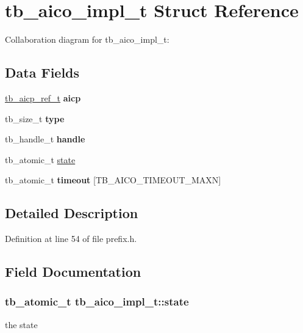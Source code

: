 \hypertarget{structtb__aico__impl__t}{\section{tb\-\_\-aico\-\_\-impl\-\_\-t Struct Reference}
\label{structtb__aico__impl__t}
}


Collaboration diagram for tb\-\_\-aico\-\_\-impl\-\_\-t\-:
\subsection*{Data Fields}
\begin{DoxyCompactItemize}
\item 
\hypertarget{structtb__aico__impl__t_a6de17735a82d4990b713bb2962cb177c}{\hyperlink{structtb__aicp__ref__t}{tb\-\_\-aicp\-\_\-ref\-\_\-t} {\bfseries aicp}}\label{structtb__aico__impl__t_a6de17735a82d4990b713bb2962cb177c}

\item 
\hypertarget{structtb__aico__impl__t_a4c6665defe1f6db4df3e20abfc0e8626}{tb\-\_\-size\-\_\-t {\bfseries type}}\label{structtb__aico__impl__t_a4c6665defe1f6db4df3e20abfc0e8626}

\item 
\hypertarget{structtb__aico__impl__t_a20fee3148d77278e186319ff64fad7b6}{tb\-\_\-handle\-\_\-t {\bfseries handle}}\label{structtb__aico__impl__t_a20fee3148d77278e186319ff64fad7b6}

\item 
tb\-\_\-atomic\-\_\-t \hyperlink{structtb__aico__impl__t_ab24d6c5dfa6466247b841acf5812c434}{state}
\item 
\hypertarget{structtb__aico__impl__t_a92d383a02f043ce375201d3610503dc3}{tb\-\_\-atomic\-\_\-t {\bfseries timeout} \mbox{[}T\-B\-\_\-\-A\-I\-C\-O\-\_\-\-T\-I\-M\-E\-O\-U\-T\-\_\-\-M\-A\-X\-N\mbox{]}}\label{structtb__aico__impl__t_a92d383a02f043ce375201d3610503dc3}

\end{DoxyCompactItemize}


\subsection{Detailed Description}


Definition at line 54 of file prefix.\-h.



\subsection{Field Documentation}
\hypertarget{structtb__aico__impl__t_ab24d6c5dfa6466247b841acf5812c434}{
\subsubsection[{state}]{\setlength{\rightskip}{0pt plus 5cm}tb\-\_\-atomic\-\_\-t tb\-\_\-aico\-\_\-impl\-\_\-t\-::state}}\label{structtb__aico__impl__t_ab24d6c5dfa6466247b841acf5812c434}
the state


